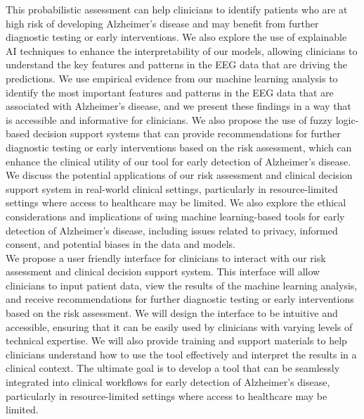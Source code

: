 \documentclass[openany]{book}
\begin{document}
This probabilistic assessment can help clinicians to identify patients who are at high risk of developing Alzheimer's disease and may benefit from further diagnostic testing or early interventions. We also explore the use of explainable AI techniques to enhance the interpretability of our models, allowing clinicians to understand the key features and patterns in the EEG data that are driving the predictions. We use empirical evidence from our machine learning analysis to identify the most important features and patterns in the EEG data that are associated with Alzheimer's disease, and we present these findings in a way that is accessible and informative for clinicians. We also propose the use of fuzzy logic-based decision support systems that can provide recommendations for further diagnostic testing or early interventions based on the risk assessment, which can enhance the clinical utility of our tool for early detection of Alzheimer's disease. We discuss the potential applications of our risk assessment and clinical decision support system in real-world clinical settings, particularly in resource-limited settings where access to healthcare may be limited. We also explore the ethical considerations and implications of using machine learning-based tools for early detection of Alzheimer's disease, including issues related to privacy, informed consent, and potential biases in the data and models. \\ 
We propose a user friendly interface for clinicians to interact with our risk assessment and clinical decision support system. This interface will allow clinicians to input patient data, view the results of the machine learning analysis, and receive recommendations for further diagnostic testing or early interventions based on the risk assessment. We will design the interface to be intuitive and accessible, ensuring that it can be easily used by clinicians with varying levels of technical expertise. We will also provide training and support materials to help clinicians understand how to use the tool effectively and interpret the results in a clinical context. The ultimate goal is to develop a tool that can be seamlessly integrated into clinical workflows for early detection of Alzheimer's disease, particularly in resource-limited settings where access to healthcare may be limited. \\
\end{document}
